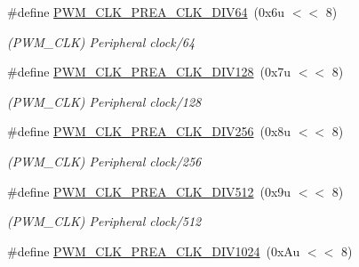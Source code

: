 \begin{DoxyCompactItemize}
\mbox{\label{group__SAMS70__PWM_ga178e412966e10c888eac32104042a581}} 
\#define \mbox{\hyperlink{group__SAMS70__PWM_ga178e412966e10c888eac32104042a581}{P\+W\+M\+\_\+\+C\+L\+K\+\_\+\+P\+R\+E\+A\+\_\+\+C\+L\+K\+\_\+\+D\+I\+V64}}~(0x6u $<$$<$ 8)
\begin{DoxyCompactList}\small\item\em (P\+W\+M\+\_\+\+C\+LK) Peripheral clock/64 \end{DoxyCompactList}\item 
\mbox{\label{group__SAMS70__PWM_ga8dcee1a03b78b3780326312cee74a047}} 
\#define \mbox{\hyperlink{group__SAMS70__PWM_ga8dcee1a03b78b3780326312cee74a047}{P\+W\+M\+\_\+\+C\+L\+K\+\_\+\+P\+R\+E\+A\+\_\+\+C\+L\+K\+\_\+\+D\+I\+V128}}~(0x7u $<$$<$ 8)
\begin{DoxyCompactList}\small\item\em (P\+W\+M\+\_\+\+C\+LK) Peripheral clock/128 \end{DoxyCompactList}\item 
\mbox{\label{group__SAMS70__PWM_ga2b6c73e5a4deebd5e429bd3aaadf837b}} 
\#define \mbox{\hyperlink{group__SAMS70__PWM_ga2b6c73e5a4deebd5e429bd3aaadf837b}{P\+W\+M\+\_\+\+C\+L\+K\+\_\+\+P\+R\+E\+A\+\_\+\+C\+L\+K\+\_\+\+D\+I\+V256}}~(0x8u $<$$<$ 8)
\begin{DoxyCompactList}\small\item\em (P\+W\+M\+\_\+\+C\+LK) Peripheral clock/256 \end{DoxyCompactList}\item 
\mbox{\label{group__SAMS70__PWM_gaf721401087a93bac5aeb4bf8a9ac235e}} 
\#define \mbox{\hyperlink{group__SAMS70__PWM_gaf721401087a93bac5aeb4bf8a9ac235e}{P\+W\+M\+\_\+\+C\+L\+K\+\_\+\+P\+R\+E\+A\+\_\+\+C\+L\+K\+\_\+\+D\+I\+V512}}~(0x9u $<$$<$ 8)
\begin{DoxyCompactList}\small\item\em (P\+W\+M\+\_\+\+C\+LK) Peripheral clock/512 \end{DoxyCompactList}\item 
\mbox{\label{group__SAMS70__PWM_ga4ac8af0adc0d5842914af03ef91e93ce}} 
\#define \mbox{\hyperlink{group__SAMS70__PWM_ga4ac8af0adc0d5842914af03ef91e93ce}{P\+W\+M\+\_\+\+C\+L\+K\+\_\+\+P\+R\+E\+A\+\_\+\+C\+L\+K\+\_\+\+D\+I\+V1024}}~(0x\+Au $<$$<$ 8)
$$
\end{DoxyCompactItemize}

